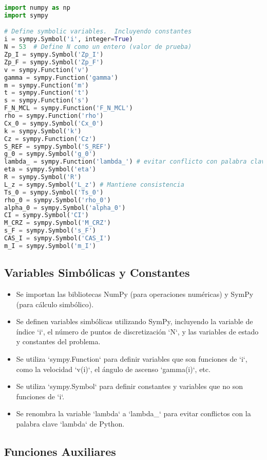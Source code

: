 \documentclass[fleqn]{article}
\begin{document}
\begin{lstlisting}[language=Python, firstnumber=last, style = mystyle]
import numpy as np
import sympy

# Define symbolic variables.  Incluyendo constantes
i = sympy.Symbol('i', integer=True)
N = 53  # Define N como un entero (valor de prueba)
Zp_I = sympy.Symbol('Zp_I')
Zp_F = sympy.Symbol('Zp_F')
v = sympy.Function('v')
gamma = sympy.Function('gamma')
m = sympy.Function('m')
t = sympy.Function('t')
s = sympy.Function('s')
F_N_MCL = sympy.Function('F_N_MCL')
rho = sympy.Function('rho')
Cx_0 = sympy.Symbol('Cx_0')
k = sympy.Symbol('k')
Cz = sympy.Function('Cz')
S_REF = sympy.Symbol('S_REF')
g_0 = sympy.Symbol('g_0')
lambda_ = sympy.Function('lambda_') # evitar conflicto con palabra clave lambda
eta = sympy.Symbol('eta')
R = sympy.Symbol('R')
L_z = sympy.Symbol('L_z') # Mantiene consistencia
Ts_0 = sympy.Symbol('Ts_0')
rho_0 = sympy.Symbol('rho_0')
alpha_0 = sympy.Symbol('alpha_0')
CI = sympy.Symbol('CI')
M_CRZ = sympy.Symbol('M_CRZ')
s_F = sympy.Symbol('s_F')
CAS_I = sympy.Symbol('CAS_I')
m_I = sympy.Symbol('m_I')
\end{lstlisting}

\subsection{Variables Simbólicas y Constantes}

\begin{itemize}
    \item Se importan las bibliotecas NumPy (para operaciones numéricas) y SymPy (para cálculo simbólico).
    \item Se definen variables simbólicas utilizando SymPy, incluyendo la variable de índice `i`, el número de puntos de discretización `N`, y las variables de estado y constantes del problema. 
    \item Se utiliza `sympy.Function` para definir variables que son funciones de `i`, como la velocidad `v(i)`, el ángulo de ascenso `gamma(i)`, etc.
    \item Se utiliza `sympy.Symbol` para definir constantes y variables que no son funciones de `i`.
    \item Se renombra la variable `lambda` a `lambda\_` para evitar conflictos con la palabra clave `lambda` de Python.
\end{itemize}



\subsection{Funciones Auxiliares}
\end{document}
